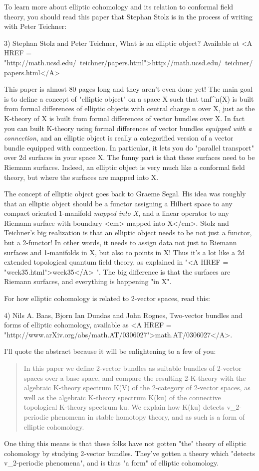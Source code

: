 To learn more about elliptic cohomology and its relation
to conformal field theory, you should read this paper that
Stephan Stolz is in the process of writing with Peter Teichner:

3) Stephan Stolz and Peter Teichner, What is an elliptic object?
Available at
<A HREF = "http://math.ucsd.edu/~teichner/papers.html">http://math.ucsd.edu/~teichner/papers.html</A>

This paper is almost 80 pages long and they aren't even
done yet!  The main goal is to define a concept of "elliptic
object" on a space X such that tmf^{n}(X) is built from
formal differences of elliptic objects with central charge n over X, just as
the K-theory of X is built from formal differences of vector
bundles over X.  In fact you can built K-theory using formal
differences of vector bundles \emph{equipped with a connection},
and an elliptic object is really a categorified version of
a vector bundle equipped with connection.  In particular, 
it lets you do "parallel transport" over 2d surfaces
in your space X.  The funny part is that these surfaces need
to be Riemann surfaces.  Indeed, an elliptic object
is very much like a conformal field theory, but where the surfaces
are mapped into X.  

The concept of elliptic object goes back to Graeme Segal.
His idea was roughly that an elliptic object should be a 
functor assigning a Hilbert space to any 
compact oriented 1-manifold \emph{mapped into X}, and 
a linear operator to any Riemann surface with boundary <em>
mapped into X</em>.
Stolz and Teichner's big realization is that an elliptic
object needs to be not just a functor, but a 2-functor!
In other words, it needs to assign data not just to Riemann
surfaces and 1-manifolds in X, but also to points in X!
Thus it's a lot like a 2d extended topological quantum field
theory, as explained in "<A HREF = "week35.html">week35</A>
".   The 
big difference is that the surfaces are Riemann surfaces,
and everything is happening "in X".

For how elliptic cohomology is related to 2-vector spaces,
read this:

4) Nils A. Baas, Bjorn Ian Dundas and John Rognes, Two-vector
bundles and forms of elliptic cohomology, available as 
<A HREF = "http://www.arXiv.org/abs/math.AT/0306027">math.AT/0306027</A>.

I'll quote the abstract because it will be enlightening to
a few of you:

\begin{quote}
  In this paper we define 2-vector bundles as suitable bundles of 
  2-vector spaces over a base space, and compare the resulting 
  2-K-theory with the algebraic K-theory spectrum K(V) of the 
  2-category of 2-vector spaces, as well as the algebraic 
  K-theory spectrum K(ku) of the connective topological K-theory 
  spectrum ku. We explain how K(ku) detects v_{2}-periodic phenomena 
  in stable homotopy theory, and as such is a form of elliptic cohomology. 
\end{quote}
One thing this means is that these folks have not gotten "the" 
theory of elliptic cohomology by studying 2-vector bundles.
They've gotten a theory which "detects v_{2}-periodic 
phenomena",
and is thus "a form" of elliptic cohomology.  

